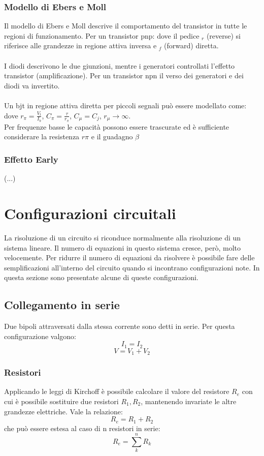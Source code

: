 \documentclass{article}
\begin{document}
\subsubsection{Modello di Ebers e Moll}
Il modello di Ebers e Moll descrive il comportamento del transistor in tutte le regioni di funzionamento. Per un transistor pnp:
dove il pedice $_r$ (reverse) si riferisce alle grandezze in regione attiva inversa e $_f$ (forward) diretta.\\\\
I diodi descrivono le due giunzioni, mentre i generatori controllati l'effetto transistor (amplificazione).
Per un transistor npn il verso dei generatori e dei diodi va invertito.\\\\
Un bjt in regione attiva diretta per piccoli segnali può essere modellato come:
dove $r_\pi=\frac{V_t}{I_b}$, $C_\pi=\frac{\tau}{r_\pi}$, $C_\mu=C_j$, $r_\mu\rightarrow\infty$. 
\\Per frequenze basse le capacità possono essere trascurate ed è sufficiente considerare la resistenza $r\pi$ e il guadagno $\beta$

\subsubsection{Effetto Early}
(...)

\newpage
\section{Configurazioni circuitali}
La risoluzione di un circuito si riconduce normalmente alla risoluzione di un sistema lineare. Il numero di equazioni in questo sistema cresce, però, molto velocemente. Per ridurre il numero di equazioni da risolvere è possibile fare delle semplificazioni all'interno del circuito quando si incontrano configurazioni note. In questa sezione sono presentate alcune di queste configurazioni.

\subsection{Collegamento in serie}
Due bipoli attraversati dalla stessa corrente sono detti in serie.
Per questa configurazione valgono:
$$ I_1=I_2 $$
$$ V=V_1+V_2 $$

\subsubsection{Resistori}
Applicando le leggi di Kirchoff è possibile calcolare il valore del resistore $R_e$ con cui è possibile sostituire due resistori $R_1,R_2$, mantenendo invariate le altre grandezze elettriche. Vale la relazione:
$$ R_e=R_1+R_2 $$
che può essere estesa al caso di n resistori in serie:
$$ R_e=\sum_k^nR_k $$
\end{document}
